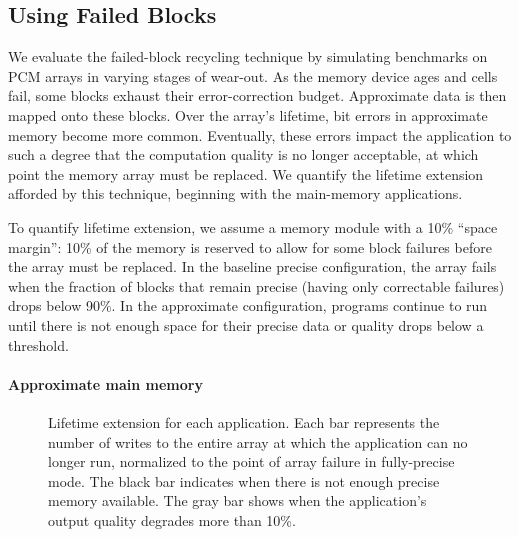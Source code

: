 \documentclass[prodmode,acmtocs]{acmsmall}
\begin{document}
\subsection{Using Failed Blocks}

We evaluate the failed-block recycling technique by simulating
benchmarks on PCM arrays in varying stages of wear-out. As the
memory device ages and cells fail, some blocks exhaust their
error-correction budget. Approximate data is then mapped onto these
blocks.
Over the array's lifetime,
bit errors in approximate memory
become more common. Eventually, these errors impact the application to such a
degree that the computation quality is no longer acceptable, at which point the
memory array must be replaced.
We quantify the
lifetime extension afforded by this technique, beginning with the
main-memory applications.

To quantify lifetime extension, we assume a memory module with a 10\% ``space
margin'': 10\% of the memory is reserved to allow for some block
failures before the array must be replaced. In the baseline precise
configuration, the array fails when the fraction of blocks that remain
precise (having only correctable failures) drops below 90\%. In the approximate
configuration, programs continue to run until there is not enough space for
their precise data or quality drops below a threshold.

\paragraph{Approximate main memory}

\begin{figure}
    \centering
    
    \caption{
        Lifetime extension for each application.
    Each bar represents the number of writes to the entire array at
    which the application can no longer run,
    normalized to the point of array failure in fully-precise mode.
    The black bar indicates when there is not enough precise
    memory available. The gray bar shows when the application's
    output quality degrades more than 10\%.
    }
    \label{fig:extension}
\end{figure}
\end{document}

